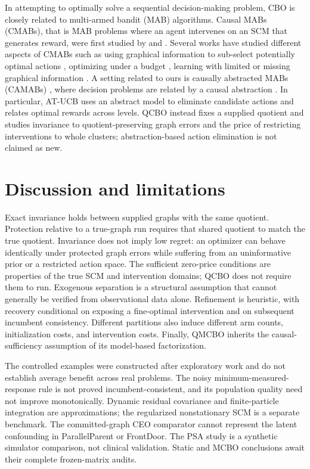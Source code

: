\documentclass[twoside]{article}
\begin{document}
In attempting to optimally solve a sequential decision-making problem, CBO is closely related to multi-armed bandit (MAB) algorithms. Causal MABs (CMABs), that is MAB problems where an agent intervenes on an SCM that generates reward, were first studied by \citet{bareinboim2015bandits} and \citet{lattimore2016causal}. Several works have studied different aspects of CMABs such as using graphical information to sub-select potentially optimal actions \citep{lee2018structural,lee2019structural}, optimizing under a budget \citep{nair2021budgeted}, learning with limited or missing graphical information \cite{park2025structural,konobeev2023causal}. A setting related to ours is causally abstracted MABs (CAMABs) \citep{zennaro2024causally,dyer2025using}, where decision problems are related by a causal abstraction \citep{rubenstein2017causal,schooltink2024aligning}. In particular, AT-UCB uses an abstract model to eliminate candidate actions and relates optimal rewards across levels. QCBO instead fixes a supplied quotient and studies invariance to quotient-preserving graph errors and the price of restricting interventions to whole clusters; abstraction-based action elimination is not claimed as new.

\section{Discussion and limitations}
\label{sec:limitations}

Exact invariance holds between supplied graphs with the same quotient. Protection relative to a true-graph run requires that shared quotient to match the true quotient. Invariance does not imply low regret: an optimizer can behave identically under protected graph errors while suffering from an uninformative prior or a restricted action space. The sufficient zero-price conditions are properties of the true SCM and intervention domains; QCBO does not require them to run. Exogenous separation is a structural assumption that cannot generally be verified from observational data alone. Refinement is heuristic, with recovery conditional on exposing a fine-optimal intervention and on subsequent incumbent consistency. Different partitions also induce different arm counts, initialization costs, and intervention costs. Finally, QMCBO inherits the causal-sufficiency
assumption of its model-based factorization.

The controlled examples were constructed after exploratory work and do not establish average benefit across real problems. The noisy minimum-measured-response rule is not proved incumbent-consistent, and its population quality need not improve monotonically. Dynamic residual covariance and finite-particle integration are approximations; the regularized nonstationary SCM is a separate benchmark. The committed-graph CEO comparator cannot represent the latent confounding in ParallelParent or FrontDoor. The PSA study is a synthetic simulator comparison, not clinical validation. Static and MCBO conclusions await their complete frozen-matrix audits.
\end{document}
